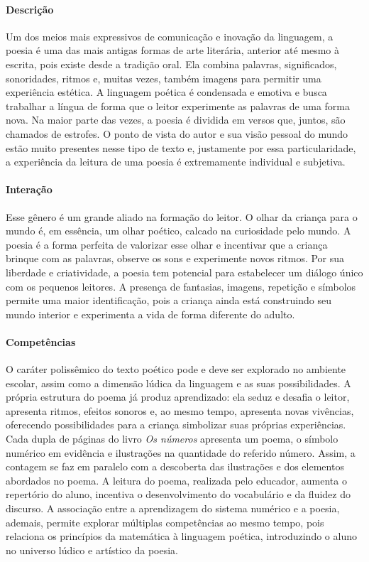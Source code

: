 \documentclass[11pt]{extarticle}
\begin{document}
\paragraph{Descrição} Um dos meios mais expressivos de comunicação e inovação da linguagem, a poesia é uma das mais antigas formas de arte literária, anterior até mesmo à escrita, pois existe desde a tradição oral. Ela combina palavras, significados, sonoridades, ritmos e, muitas vezes, também imagens para permitir uma experiência estética. A linguagem poética é condensada e emotiva e busca trabalhar a língua de forma que o leitor experimente as palavras de uma forma nova. Na maior parte das vezes, a poesia é dividida em versos que, juntos, são chamados de estrofes. O ponto de vista do autor e sua visão pessoal do mundo estão muito presentes nesse tipo de texto e, justamente por essa particularidade, a experiência da leitura de uma poesia é extremamente individual e subjetiva.

\paragraph{Interação} Esse gênero é um grande aliado na formação do leitor. O olhar da criança para o mundo é, em essência, um olhar poético, calcado na curiosidade pelo mundo. A poesia é a forma perfeita de valorizar esse olhar e incentivar que a criança brinque com as palavras, observe os sons e experimente novos ritmos. Por sua liberdade e criatividade, a poesia tem potencial para estabelecer um diálogo único com os pequenos leitores. A presença de fantasias, imagens, repetição e símbolos permite uma maior identificação, pois a criança ainda está construindo seu mundo interior e experimenta a vida de forma diferente do adulto. 

\paragraph{Competências} 
O caráter polissêmico do texto poético pode e deve ser explorado no ambiente escolar, assim como a dimensão lúdica da linguagem e as suas possibilidades. A própria estrutura do poema já produz aprendizado: ela seduz e desafia o leitor, apresenta ritmos, efeitos sonoros e, ao mesmo tempo, apresenta novas vivências, oferecendo possibilidades para a criança simbolizar suas próprias experiências. Cada dupla de páginas do livro \textit{Os números} apresenta um poema, o símbolo numérico em evidência e ilustrações na quantidade do referido número. Assim, a contagem se faz em paralelo com a descoberta das ilustrações e dos elementos abordados no poema. A leitura do poema, realizada pelo educador, aumenta o repertório do aluno, incentiva o desenvolvimento do vocabulário e da fluidez do discurso.
A associação entre a aprendizagem do sistema numérico e a poesia, ademais, permite explorar múltiplas competências ao mesmo tempo, pois relaciona os princípios da matemática à linguagem poética, introduzindo o aluno no universo lúdico e artístico da poesia.
\end{document}
